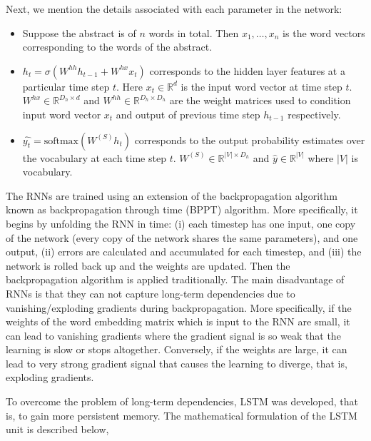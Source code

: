 Next, we mention the details associated with each parameter in the network:

\begin{itemize}
    \item Suppose the abstract is of $n$ words in total. Then $x_1, \ldots, x_n$ is the word vectors corresponding to the words of the abstract.

    \item $h_t = \sigma(W^{hh}h_{t-1} + W^{hx}x_t)$ corresponds to the hidden layer features at a particular time step $t$. Here $x_t \in \mathbb{R}^d$ is the input word vector at time step $t$. $W^{hx} \in \mathbb{R}^{D_h \times d}$ and $W^{hh} \in \mathbb{R}^{D_h \times D_h}$ are the weight matrices used to condition input word vector $x_t$ and output of previous time step $h_{t-1}$ respectively.

    \item $\hat{y_t} = \text{softmax}(W^{(S)} h_t)$ corresponds to the output probability estimates over the vocabulary at each time step $t$. $W^{(S)} \in \mathbb{R}^{|V| \times D_h}$ and $\hat{y} \in \mathbb{R}^{|V|}$ where $|V|$ is vocabulary.


\end{itemize}

The RNNs are trained using an extension of the backpropagation algorithm known as backpropagation through time (BPPT) algorithm. More specifically, it begins by unfolding the RNN in time: (i) each timestep has one input, one copy of the network (every copy of the network shares the same parameters), and one output, (ii) errors are calculated and accumulated for each timestep, and (iii) the network is rolled back up and the weights are updated.  Then the backpropagation algorithm is applied traditionally. The main disadvantage of RNNs is that they can not capture long-term dependencies due to vanishing/exploding gradients during backpropagation. More specifically, if the weights of the word embedding matrix which is input to the RNN are small, it can lead to vanishing gradients where the gradient signal is so weak that the learning is slow or stops altogether. Conversely, if the weights are large, it can lead to very strong gradient signal that causes the learning to diverge, that is, exploding gradients.

To overcome the problem of long-term dependencies, LSTM was developed, that is, to gain more persistent memory. The mathematical formulation of the LSTM unit is described below,

